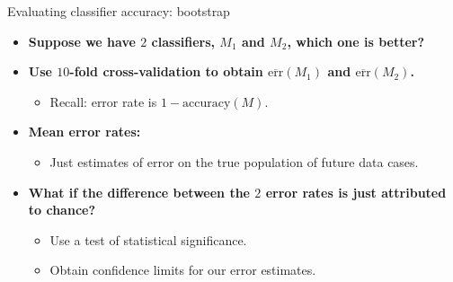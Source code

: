 \documentclass[aspectratio=169,t,table]{beamer}
\begin{document}
  {
    \begin{frame}{Evaluating classifier accuracy: bootstrap}
      \begin{itemize}
        \item \textbf{Suppose we have $2$ classifiers, $M_1$ and $M_2$, which one is better?}
        \item \textbf{Use $10$-fold cross-validation to obtain $\overline{\text{err}}(M_1)$ and $\overline{\text{err}}(M_2)$.}
        \begin{itemize}
          \item Recall: error rate is $1-\text{accuracy}(M)$.
        \end{itemize}
        \item \textbf{Mean error rates:}
        \begin{itemize}
          \item Just estimates of error on the true population of future data cases.
        \end{itemize}
        \item \textbf{What if the difference between the $2$ error rates is just attributed to chance?}
        \begin{itemize}
          \item Use a test of statistical significance.
          \item Obtain confidence limits for our error estimates.
        \end{itemize}
      \end{itemize}
    \end{frame}
  }
\end{document}
